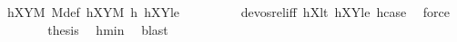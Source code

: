 \begin{isabellebody}
\ hXYM\ M{\isacharunderscore}{\kern0pt}def\ hXY{}M\ h\ hXY{}le\ \isanewline
\ \ \ \ \ \ \ \ devos{\isacharunderscore}{\kern0pt}rel{\isacharunderscore}{\kern0pt}iff\ hX{}lt\ hXY{}le\ hcase\ \isamarkupfalse%
\ force\isanewline
\ \ \ \ \isamarkupfalse%
\ \isamarkupfalse%
\ {\isacharquery}{\kern0pt}thesis\ \isamarkupfalse%
\ hmin\ \isamarkupfalse%
\ blast\isanewline
\ \ \isamarkupfalse%
\isanewline
{}\isamarkupfalse%
%
\endisatagproof
{\isafoldproof}%
%
\isadelimproof
\isanewline
%
\endisadelimproof
%
\isadelimtheory
\isanewline
%
\endisadelimtheory
%
\isatagtheory
{}\isamarkupfalse%
%
\endisatagtheory
{\isafoldtheory}%
%
\isadelimtheory
%
\endisadelimtheory
%
\end{isabellebody}%
\endinput
